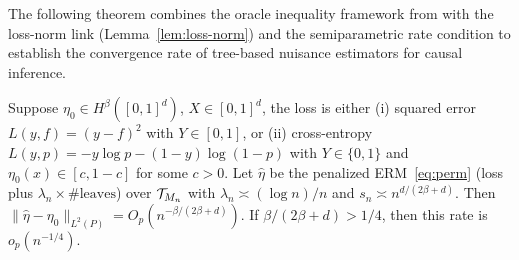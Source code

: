 \documentclass[12pt]{article}
\begin{document}
The following theorem combines the oracle inequality framework from \citet{xuStatisticalOptimalityOptimal2026} with the loss-norm link (Lemma~\ref{lem:loss-norm}) and the semiparametric rate condition to establish the convergence rate of tree-based nuisance estimators for causal inference.

\begin{theorem}
\label{thm:nuisance-rate}
Suppose $\eta_0 \in H^\beta([0,1]^d)$, $X \in [0,1]^d$, the loss is either (i) squared error $L(y,f) = (y-f)^2$ with $Y \in [0,1]$, or (ii) cross-entropy $L(y,p) = -y \log p - (1-y) \log(1-p)$ with $Y \in \{0,1\}$ and $\eta_0(x) \in [c, 1-c]$ for some $c > 0$. Let $\hat\eta$ be the penalized ERM~\eqref{eq:perm} (loss plus $\lambda_n \times \#\text{leaves}$) over $\mathcal{T}_{M_n}$ with $\lambda_n \asymp (\log n)/n$ and $s_n \asymp n^{d/(2\beta+d)}$. Then $\|\hat\eta - \eta_0\|_{L^2(P)} = O_p(n^{-\beta/(2\beta+d)})$. If $\beta/(2\beta+d) > 1/4$, then this rate is $o_p(n^{-1/4})$.
\end{theorem}
\end{document}
